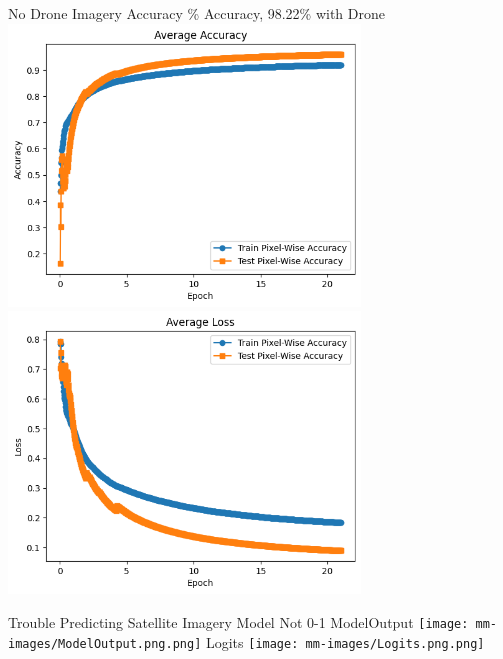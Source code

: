 \begin{frame}{No Drone Imagery Accuracy}
    \% Accuracy, 98.22\% with Drone
    \includegraphics[height=0.7\textheight,width=0.7\textwidth,keepaspectratio]{mm-images/AvgAcc.png}
    \includegraphics[height=0.7\textheight,width=0.7\textwidth,keepaspectratio]{mm-images/AvgLoss.png}
\end{frame}

\begin{frame}{Trouble Predicting Satellite Imagery}
    \centering
    Model Not 0-1
    ModelOutput
    \texttt{[image: mm-images/ModelOutput.png.png]}
    Logits
    \texttt{[image: mm-images/Logits.png.png]}
\end{frame}